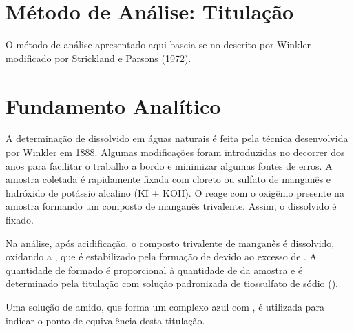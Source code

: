 \documentclass[a4paper,10pt]{SelfArx}
\affiliation{~} %
\begin{document}
\flushbottom %
\maketitle %
\renewcommand{\contentsname}{Conteúdo}
\tableofcontents %
\thispagestyle{empty} %

\section*{Método de Análise: Titulação } %
O método de análise apresentado aqui baseia-se no descrito por Winkler modificado por Strickland e Parsons (1972).
\section{Fundamento Analítico}

A determinação de  dissolvido em águas naturais é feita pela técnica desenvolvida por Winkler em 1888. Algumas modificações foram introduzidas no decorrer dos anos para facilitar o trabalho a bordo e minimizar algumas fontes de erros. A amostra coletada é rapidamente fixada com cloreto ou sulfato de manganês e hidróxido de potássio alcalino (KI + KOH). O  reage com o oxigênio presente na amostra formando um composto de manganês trivalente. Assim, o  dissolvido é fixado.

Na análise, após acidificação, o composto trivalente de manganês é dissolvido, oxidando  a , que é estabilizado pela formação de  devido ao excesso de . A quantidade de  formado é proporcional à quantidade de  da amostra e é determinado pela titulação com solução padronizada de tiossulfato de sódio ().

Uma solução de amido, que forma um complexo azul com , é utilizada para indicar o ponto de equivalência desta titulação.
\end{document}
